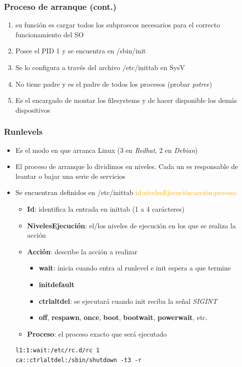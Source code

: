 \begin{frame}
  \frametitle{Proceso de arranque (cont.)}
  \begin{enumerate}
	\item su función es cargar todos los subproecos necesarios para el correcto funcionamiento del SO
	\item Posee el PID 1 y se encuentra en /sbin/init
	\item Se lo configura a través del archivo /etc/inittab en SysV
	\item No tiene padre y es el padre de todos los procesos (probar \textit{pstree})
	\item Es el encargado de montar los filesystems y de hacer disponible los demás dispositivos
  \end{enumerate}
\end{frame}

\begin{frame}[fragile]
  \frametitle{Runlevels}
  \begin{itemize}
	  	\item Es el modo en que arranca Linux (3 en \emph{Redhat}, 2 en \emph{Debian})
	  	\item El proceso de arranque lo dividimos en niveles. Cada un es responsable de leantar o bajar una serie de servicios
	  	\item Se encuentran definidos en /etc/inittab
	  	\textcolor{orange}{id:nivelesEjecución:acción:proceso}
		\begin{itemize}
			\item \textbf{Id}: identifica la entrada en inittab (1 a 4 carácteres)
			\item \textbf{NivelesEjecución}: el/los niveles de ejecución en los que se realiza la acción
			\item \textbf{Acción}: describe la acción a realizar
			\begin{itemize}
				\item \textbf{wait}: inicia cuando entra al runlevel e init espera a que termine
				\item \textbf{initdefault}
				\item \textbf{ctrlaltdel}: se ejecutará cuando init reciba la señal \emph{SIGINT}
				\item \textbf{off}, \textbf{respawn}, \textbf{once}, \textbf{boot}, \textbf{bootwait}, \textbf{powerwait}, etc.
			\end{itemize}
			\item \textbf{Proceso}: el proceso exacto que será ejecutado
		\end{itemize}
		\begin{lstlisting}
l1:1:wait:/etc/rc.d/rc 1
ca::ctrlaltdel:/sbin/shutdown -t3 -r
		\end{lstlisting}
  \end{itemize}
\end{frame}


